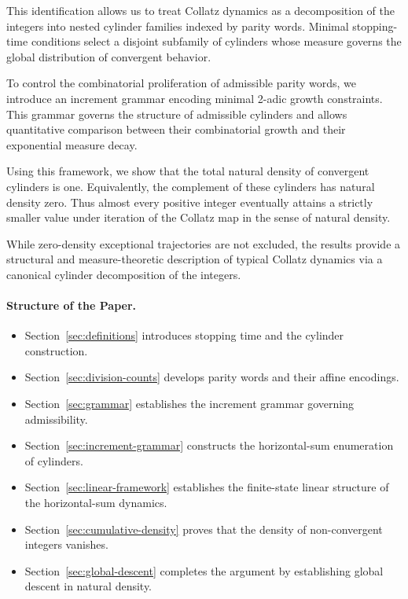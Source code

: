 \documentclass[12pt, oneside]{article}   	%
\numberwithin{equation}{section}          %
\theoremstyle{definition}
\begin{document}
This identification allows us to treat Collatz dynamics as a decomposition of the integers
into nested cylinder families indexed by parity words. Minimal stopping-time conditions
select a disjoint subfamily of cylinders whose measure governs the global distribution of
convergent behavior.

To control the combinatorial proliferation of admissible parity words, we introduce an
increment grammar encoding minimal 2-adic growth constraints. This grammar governs the
structure of admissible cylinders and allows quantitative comparison between their
combinatorial growth and their exponential measure decay.

Using this framework, we show that the total natural density of convergent cylinders is one.
Equivalently, the complement of these cylinders has natural density zero. Thus almost
every positive integer eventually attains a strictly smaller value under iteration of the
Collatz map in the sense of natural density.

While zero-density exceptional trajectories are not excluded, the results provide a
structural and measure-theoretic description of typical Collatz dynamics via a canonical
cylinder decomposition of the integers.

\paragraph{Structure of the Paper.}
\begin{itemize}
\item Section~\ref{sec:definitions} introduces stopping time and the cylinder construction.
\item Section~\ref{sec:division-counts} develops parity words and their affine encodings.
\item Section~\ref{sec:grammar} establishes the increment grammar governing admissibility.
\item Section~\ref{sec:increment-grammar} constructs the horizontal-sum enumeration of cylinders.
\item Section~\ref{sec:linear-framework} establishes the finite-state linear structure of the horizontal-sum dynamics.
\item Section~\ref{sec:cumulative-density} proves that the density of non-convergent integers vanishes.
\item Section~\ref{sec:global-descent} completes the argument by establishing global descent in natural density.
\end{itemize}
\end{document}

